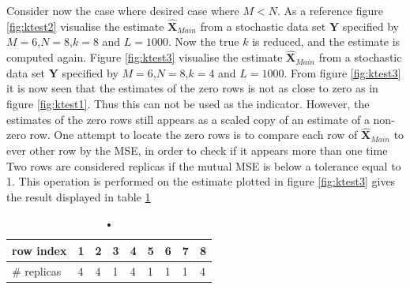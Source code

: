 Consider now the case where desired case where $M<N$. 
As a reference figure \ref{fig:ktest2} visualise the estimate $\hat{\textbf{X}}_{Main}$ from a stochastic data set $\textbf{Y}$ specified by $M=6$,$N=8$,$k=8$ and $L=1000$.  
Now the true $k$ is reduced, and the estimate is computed again.
Figure \ref{fig:ktest3} visualise the estimate $\hat{\textbf{X}}_{Main}$ from a stochastic data set $\textbf{Y}$ specified by $M=6$,$N=8$,$k=4$ and $L=1000$.
From figure \ref{fig:ktest3} it is now seen that the estimates of the zero rows is not as close to zero as in figure \ref{fig:ktest1}. Thus this can not be used as the indicator. However, the estimates of the zero rows still appears as a scaled copy of an estimate of a non-zero row. One attempt to locate the zero rows is to compare each row of $\hat{\textbf{X}}_{Main}$ to ever other row by the MSE, in order to check if it appears more than one time
Two rows are considered replicas if the mutual MSE is below a tolerance equal to 1. This operation is performed on the estimate plotted in figure \ref{fig:ktest3} gives the result displayed in table \ref{tab:replica1}

\begin{table}[h]
\begin{tabular}{|l|l|l|l|l|l|l|l|l|}
\hline
row index   & 1 & 2 & 3 & 4 & 5 & 6 & 7 & 8 \\ \hline
\# replicas & 4 & 4 & 1 & 4 & 1 & 1 & 1 & 4 \\ \hline
\end{tabular}
\caption{•}
\label{tab:replica1}
\end{table}

